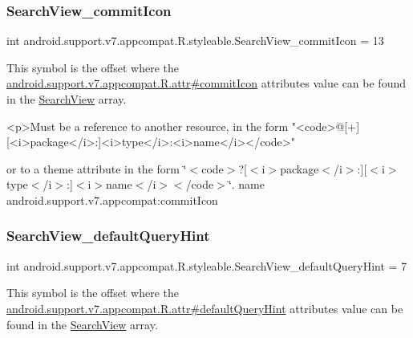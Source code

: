 \subsubsection{\texorpdfstring{Search\+View\+\_\+commit\+Icon}{SearchView\_commitIcon}}
{\footnotesize\ttfamily int android.\+support.\+v7.\+appcompat.\+R.\+styleable.\+Search\+View\+\_\+commit\+Icon = 13\hspace{0.3cm}{\ttfamily [static]}}

This symbol is the offset where the \hyperlink{classandroid_1_1support_1_1v7_1_1appcompat_1_1R_1_1attr_ad9135efd389d1f3758191b4d2f193530}{android.\+support.\+v7.\+appcompat.\+R.\+attr\#commit\+Icon} attribute\textquotesingle{}s value can be found in the \hyperlink{classandroid_1_1support_1_1v7_1_1appcompat_1_1R_1_1styleable_a01af09df9e38f1e4f57165c3d3cee9fe}{Search\+View} array.

\begin{DoxyVerb}      <p>Must be a reference to another resource, in the form "<code>@[+][<i>package</i>:]<i>type</i>:<i>name</i></code>"
\end{DoxyVerb}
 or to a theme attribute in the form \char`\"{}$<$code$>$?\mbox{[}$<$i$>$package$<$/i$>$\+:\mbox{]}\mbox{[}$<$i$>$type$<$/i$>$\+:\mbox{]}$<$i$>$name$<$/i$>$$<$/code$>$\char`\"{}.  name android.\+support.\+v7.\+appcompat\+:commit\+Icon \mbox{\label{classandroid_1_1support_1_1v7_1_1appcompat_1_1R_1_1styleable_ae4b4d1c44649fd0230d2b11b181d19bd}} 
\subsubsection{\texorpdfstring{Search\+View\+\_\+default\+Query\+Hint}{SearchView\_defaultQueryHint}}
{\footnotesize\ttfamily int android.\+support.\+v7.\+appcompat.\+R.\+styleable.\+Search\+View\+\_\+default\+Query\+Hint = 7\hspace{0.3cm}{\ttfamily [static]}}

This symbol is the offset where the \hyperlink{classandroid_1_1support_1_1v7_1_1appcompat_1_1R_1_1attr_a27da04996f4109d8ab6b9d161ca0a924}{android.\+support.\+v7.\+appcompat.\+R.\+attr\#default\+Query\+Hint} attribute\textquotesingle{}s value can be found in the \hyperlink{classandroid_1_1support_1_1v7_1_1appcompat_1_1R_1_1styleable_a01af09df9e38f1e4f57165c3d3cee9fe}{Search\+View} array.

